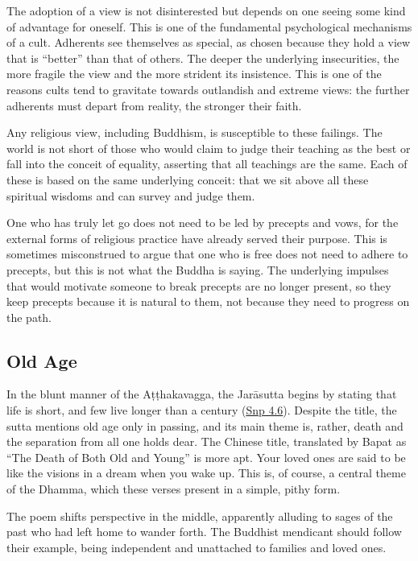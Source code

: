 \documentclass[12pt,openany]{book}%
\begin{document}
The adoption of a view is not disinterested but depends on one seeing some kind of advantage for oneself. This is one of the fundamental psychological mechanisms of a cult. Adherents see themselves as special, as chosen because they hold a view that is “better” than that of others. The deeper the underlying insecurities, the more fragile the view and the more strident its insistence. This is one of the reasons cults tend to gravitate towards outlandish and extreme views: the further adherents must depart from reality, the stronger their faith.

Any religious view, including Buddhism, is susceptible to these failings. The world is not short of those who would claim to judge their teaching as the best or fall into the conceit of equality, asserting that all teachings are the same. Each of these is based on the same underlying conceit: that we sit above all these spiritual wisdoms and can survey and judge them.

One who has truly let go does not need to be led by precepts and vows, for the external forms of religious practice have already served their purpose. This is sometimes misconstrued to argue that one who is free does not need to adhere to precepts, but this is not what the Buddha is saying. The underlying impulses that would motivate someone to break precepts are no longer present, so they keep precepts because it is natural to them, not because they need to progress on the path.

\subsection*{Old Age}

In the blunt manner of the \textsanskrit{Aṭṭhakavagga}, the \textsanskrit{Jarāsutta} begins by stating that life is short, and few live longer than a century (\href{https://suttacentral.net/snp4.6/en/sujato}{Snp 4.6}). Despite the title, the sutta mentions old age only in passing, and its main theme is, rather, death and the separation from all one holds dear. The Chinese title, translated by Bapat as “The Death of Both Old and Young” is more apt. Your loved ones are said to be like the visions in a dream when you wake up. This is, of course, a central theme of the Dhamma, which these verses present in a simple, pithy form.

The poem shifts perspective in the middle, apparently alluding to sages of the past who had left home to wander forth. The Buddhist mendicant should follow their example, being independent and unattached to families and loved ones.
\end{document}
